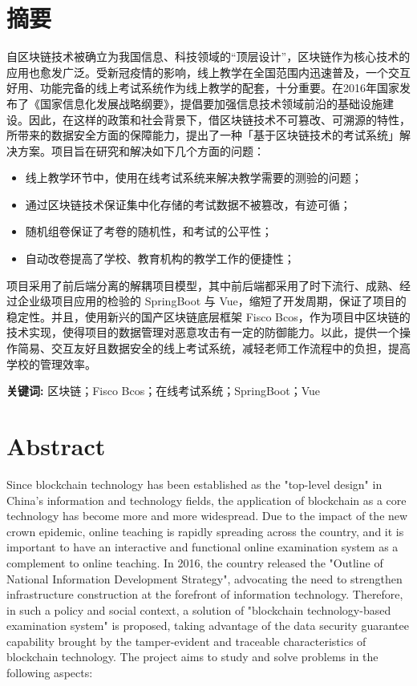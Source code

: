 \section*{\centering 摘要}
\vskip0.5cm
自区块链技术被确立为我国信息、科技领域的“顶层设计”，区块链作为核心技术的应用也愈发广泛。受新冠疫情的影响，线上教学在全国范围内迅速普及，一个交互好用、功能完备的线上考试系统作为线上教学的配套，十分重要。在2016年国家发布了《国家信息化发展战略纲要》，提倡要加强信息技术领域前沿的基础设施建设。因此，在这样的政策和社会背景下，借区块链技术不可篡改、可溯源的特性，所带来的数据安全方面的保障能力，提出了一种「基于区块链技术的考试系统」解决方案。项目旨在研究和解决如下几个方面的问题：

\begin{itemize}
    \item 线上教学环节中，使用在线考试系统来解决教学需要的测验的问题；
    \item 通过区块链技术保证集中化存储的考试数据不被篡改，有迹可循；
    \item 随机组卷保证了考卷的随机性，和考试的公平性；
    \item 自动改卷提高了学校、教育机构的教学工作的便捷性；
\end{itemize}

项目采用了前后端分离的解耦项目模型，其中前后端都采用了时下流行、成熟、经过企业级项目应用的检验的 SpringBoot 与 Vue，缩短了开发周期，保证了项目的稳定性。并且，使用新兴的国产区块链底层框架 Fisco Bcos，作为项目中区块链的技术实现，使得项目的数据管理对恶意攻击有一定的防御能力。以此，提供一个操作简易、交互友好且数据安全的线上考试系统，减轻老师工作流程中的负担，提高学校的管理效率。

\vspace*{1cm}

\textbf{关键词:} 区块链；Fisco Bcos；在线考试系统；SpringBoot；Vue

\clearpage  %

\section*{\centering \textbf{Abstract}}
\vskip0.5cm
Since blockchain technology has been established as the "top-level design" in China's information and technology fields, the application of blockchain as a core technology has become more and more widespread. Due to the impact of the new crown epidemic, online teaching is rapidly spreading across the country, and it is important to have an interactive and functional online examination system as a complement to online teaching. In 2016, the country released the "Outline of National Information Development Strategy", advocating the need to strengthen infrastructure construction at the forefront of information technology. Therefore, in such a policy and social context, a solution of "blockchain technology-based examination system" is proposed, taking advantage of the data security guarantee capability brought by the tamper-evident and traceable characteristics of blockchain technology. The project aims to study and solve problems in the following aspects:

